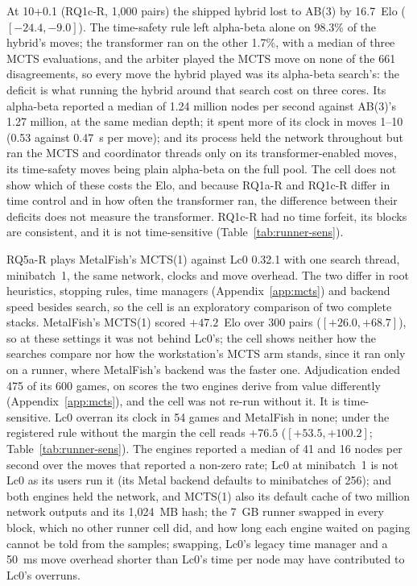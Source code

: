 \documentclass{article}
\newcommand{\MF}{MetalFish}
\begin{document}
At 10+0.1 (RQ1c-R, 1{,}000 pairs) the shipped hybrid lost to AB(3) by 16.7~Elo ($[-24.4, -9.0]$). The time-safety rule left alpha-beta alone on 98.3\% of the hybrid's moves; the transformer ran on the other 1.7\%, with a median of three MCTS evaluations, and the arbiter played the MCTS move on none of the 661 disagreements, so every move the hybrid played was its alpha-beta search's: the deficit is what running the hybrid around that search cost on three cores. Its alpha-beta reported a median of 1.24 million nodes per second against AB(3)'s 1.27 million, at the same median depth; it spent more of its clock in moves 1--10 (0.53 against 0.47~s per move); and its process held the network throughout but ran the MCTS and coordinator threads only on its transformer-enabled moves, its time-safety moves being plain alpha-beta on the full pool. The cell does not show which of these costs the Elo, and because RQ1a-R and RQ1c-R differ in time control and in how often the transformer ran, the difference between their deficits does not measure the transformer. RQ1c-R had no time forfeit, its blocks are consistent, and it is not time-sensitive (Table~\ref{tab:runner-sens}).

RQ5a-R plays \MF{}'s MCTS(1) against Lc0 0.32.1 with one search thread, minibatch~1, the same network, clocks and move overhead. The two differ in root heuristics, stopping rules, time managers (Appendix~\ref{app:mcts}) and backend speed besides search, so the cell is an exploratory comparison of two complete stacks. \MF{}'s MCTS(1) scored $+47.2$~Elo over 300 pairs ($[+26.0, +68.7]$), so at these settings it was not behind Lc0's; the cell shows neither how the searches compare nor how the workstation's MCTS arm stands, since it ran only on a runner, where \MF{}'s backend was the faster one. Adjudication ended 475 of its 600 games, on scores the two engines derive from value differently (Appendix~\ref{app:mcts}), and the cell was not re-run without it. It is time-sensitive. Lc0 overran its clock in 54 games and \MF{} in none; under the registered rule without the margin the cell reads $+76.5$ ($[+53.5, +100.2]$; Table~\ref{tab:runner-sens}). The engines reported a median of 41 and 16 nodes per second over the moves that reported a non-zero rate; Lc0 at minibatch~1 is not Lc0 as its users run it (its Metal backend defaults to minibatches of 256); and both engines held the network, and MCTS(1) also its default cache of two million network outputs and its 1{,}024~MB hash; the 7~GB runner swapped in every block, which no other runner cell did, and how long each engine waited on paging cannot be told from the samples; swapping, Lc0's legacy time manager and a 50~ms move overhead shorter than Lc0's time per node may have contributed to Lc0's overruns.
\end{document}
